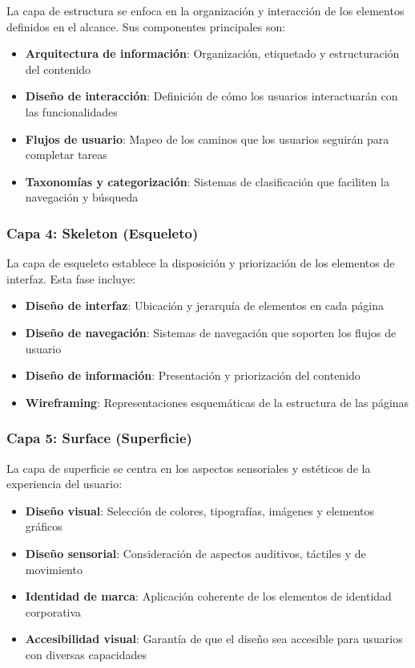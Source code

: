 La capa de estructura se enfoca en la organización y interacción de los elementos definidos en el alcance. Sus componentes principales son:

\begin{itemize}
    \item \textbf{Arquitectura de información}: Organización, etiquetado y estructuración del contenido
    \item \textbf{Diseño de interacción}: Definición de cómo los usuarios interactuarán con las funcionalidades
    \item \textbf{Flujos de usuario}: Mapeo de los caminos que los usuarios seguirán para completar tareas
    \item \textbf{Taxonomías y categorización}: Sistemas de clasificación que faciliten la navegación y búsqueda
\end{itemize}

\subsubsection{Capa 4: Skeleton (Esqueleto)}

La capa de esqueleto establece la disposición y priorización de los elementos de interfaz. Esta fase incluye:

\begin{itemize}
    \item \textbf{Diseño de interfaz}: Ubicación y jerarquía de elementos en cada página
    \item \textbf{Diseño de navegación}: Sistemas de navegación que soporten los flujos de usuario
    \item \textbf{Diseño de información}: Presentación y priorización del contenido
    \item \textbf{Wireframing}: Representaciones esquemáticas de la estructura de las páginas
\end{itemize}

\subsubsection{Capa 5: Surface (Superficie)}

La capa de superficie se centra en los aspectos sensoriales y estéticos de la experiencia del usuario:

\begin{itemize}
    \item \textbf{Diseño visual}: Selección de colores, tipografías, imágenes y elementos gráficos
    \item \textbf{Diseño sensorial}: Consideración de aspectos auditivos, táctiles y de movimiento
    \item \textbf{Identidad de marca}: Aplicación coherente de los elementos de identidad corporativa
    \item \textbf{Accesibilidad visual}: Garantía de que el diseño sea accesible para usuarios con diversas capacidades
\end{itemize}

